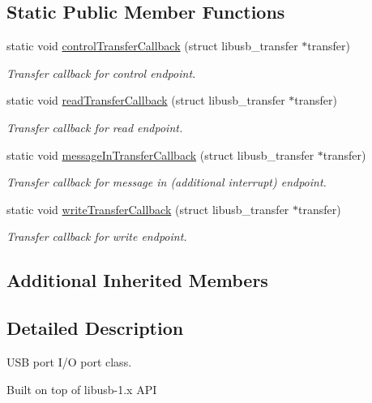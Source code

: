 \subsection*{Static Public Member Functions}
\begin{DoxyCompactItemize}
\item 
static void \hyperlink{classmdt_usb_port_a84ddd2d0bf77b4db60358846c7da4853}{control\-Transfer\-Callback} (struct libusb\-\_\-transfer $\ast$transfer)
\begin{DoxyCompactList}\small\item\em Transfer callback for control endpoint. \end{DoxyCompactList}\item 
static void \hyperlink{classmdt_usb_port_ab4f1f0456c84f954604b192f6085c3f2}{read\-Transfer\-Callback} (struct libusb\-\_\-transfer $\ast$transfer)
\begin{DoxyCompactList}\small\item\em Transfer callback for read endpoint. \end{DoxyCompactList}\item 
static void \hyperlink{classmdt_usb_port_ae8932368e2777356695ab69f6ed08f41}{message\-In\-Transfer\-Callback} (struct libusb\-\_\-transfer $\ast$transfer)
\begin{DoxyCompactList}\small\item\em Transfer callback for message in (additional interrupt) endpoint. \end{DoxyCompactList}\item 
static void \hyperlink{classmdt_usb_port_af910071a5a5c401cd20cee3519120cc2}{write\-Transfer\-Callback} (struct libusb\-\_\-transfer $\ast$transfer)
\begin{DoxyCompactList}\small\item\em Transfer callback for write endpoint. \end{DoxyCompactList}\end{DoxyCompactItemize}
\subsection*{Additional Inherited Members}


\subsection{Detailed Description}
U\-S\-B port I/\-O port class. 

Built on top of libusb-\/1.\-x A\-P\-I

